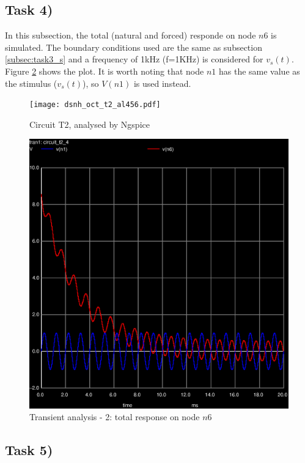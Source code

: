 \subsection{Task 4)}
\label{subsec:task4_s}

In this subsection, the total (natural and forced) responde on node $n6$ is simulated. The boundary
conditions used are the same as subsection \ref{subsec:task3_s} and a frequency of 1kHz (f=1KHz) is
considered for $v_s(t)$. Figure \ref{fig:trans-2} shows the plot. It is worth noting that node $n1$ has
the same value as the stimulus ($v_s(t)$), so $V(n1)$ is used instead.

\begin{figure}[H]
	\centering
	\texttt{[image: dsnh\_oct\_t2\_al456.pdf]}
	\caption{Circuit T2, analysed by Ngspice}
\label{circ_ori}
\end{figure}

\begin{figure}[H]
	\centering
	\includegraphics[width=0.55\linewidth]{trans-2.eps}
	\caption{Transient analysis - 2: total response on node $n6$}
\label{fig:trans-2}
\end{figure}


\subsection{Task 5)}
\label{subsec:task5_s}

